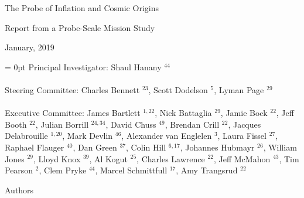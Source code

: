 \documentclass[PICOReport.tex]{subfiles}
\begin{document}

\LARGE{ \centerline{The Probe of Inflation and Cosmic Origins}}
\vspace{0.1in}
\Large{ \centerline{Report from a Probe-Scale Mission Study}}
\Large{ \centerline{January, 2019 }}

\parindent = 0pt
\normalsize{Principal Investigator: Shaul Hanany $^{44}$ }\\
\vspace{-7pt} \\
\normalsize{Steering Committee: Charles Bennett $^{23}$, Scott Dodelson $^{5}$, Lyman Page $^{29}$ } \\
\vspace{-7pt} \\
\normalsize{Executive Committee: 
James Bartlett $^{1,22}$,
Nick Battaglia $^{29}$,
Jamie Bock $^{22}$, 
Jeff Booth $^{22}$,
Julian Borrill $^{24,34}$, 
David Chuss $^{49}$,
Brendan Crill $^{22}$, 
Jacques Delabrouille $^{1,20}$,
Mark Devlin $^{46}$, 
Alexander van Englelen $^3$,
Laura Fissel $^{27}$,
Raphael Flauger $^{40}$, 
Dan Green $^{37}$,
Colin Hill $^{6,17}$,
Johannes Hubmayr $^{26}$,
William Jones $^{29}$, 
Lloyd Knox $^{39}$, 
Al Kogut $^{25}$, 
Charles Lawrence $^{22}$, 
Jeff McMahon $^{43}$, 
Tim Pearson $^{2}$,
Clem Pryke $^{44}$, 
Marcel Schmittfull $^{17}$,
Amy Trangsrud $^{22}$ 
}
\\


\label{authorlist}

\Large  {\centerline {Authors}}
\end{document}
